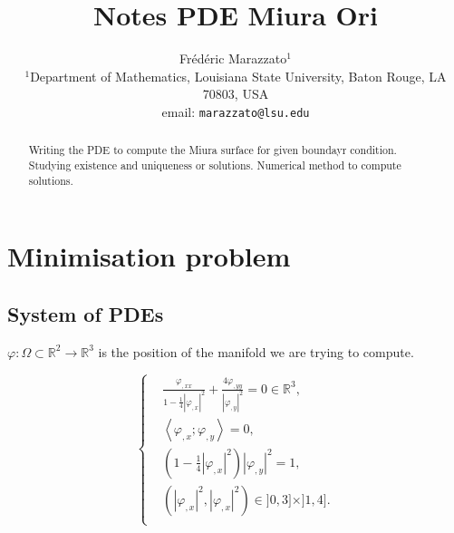 

\title{Notes PDE Miura Ori}
\author{\begin{minipage}{\textwidth}\centering Fr\'ed\'eric
Marazzato$^{1}$\\
   \small{$^{1}$Department of Mathematics, Louisiana State University, Baton Rouge, LA 70803, USA}\\
   \small{email: \texttt{marazzato@lsu.edu}}\end{minipage}}
      
   


\maketitle

\begin{abstract}
Writing the PDE to compute the Miura surface for given boundayr condition. Studying existence and uniqueness or solutions. Numerical method to compute solutions.
\end{abstract}

\section{Minimisation problem}

\subsection{System of PDEs}

$\varphi : \Omega \subset \mathbb{R}^2 \rightarrow \mathbb{R}^3$ is the position of the manifold we are trying to compute.

\begin{equation}
\label{eq:strong form equations}
\left\{
\begin{aligned}
& \frac{\varphi_{,xx}}{1 - \frac14 |\varphi_{,x}|^2} + \frac{4\varphi_{,yy}}{|\varphi_{,y}|^2} = 0 \in \mathbb{R}^3,\\
& \left\langle \varphi_{,x} ; \varphi_{,y} \right\rangle = 0, \\
& (1 - \frac14 |\varphi_{,x}|^2) |\varphi_{,y}|^2 = 1, \\
& (|\varphi_{,x}|^2, |\varphi_{,x}|^2) \in ]0,3]\times ]1,4]. \\
\end{aligned}
\right.
\end{equation}


